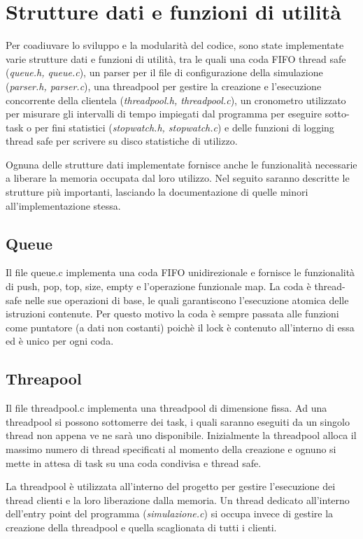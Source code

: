 \documentclass[11pt]{article}
\begin{document}
\section{Strutture dati e funzioni di utilità}
Per coadiuvare lo sviluppo e la modularità del codice, sono state implementate
varie strutture dati e funzioni di utilità, tra le quali una coda FIFO thread
safe (\emph{queue.h, queue.c}), un parser per il file di configurazione della
simulazione (\emph{parser.h, parser.c}), una threadpool per gestire la
creazione e l'esecuzione concorrente della clientela (\emph{threadpool.h,
  threadpool.c}), un cronometro utilizzato per misurare gli intervalli di tempo
impiegati dal programma per eseguire sotto-task o per fini statistici
(\emph{stopwatch.h, stopwatch.c}) e delle funzioni di logging thread safe per
scrivere su disco statistiche di utilizzo.

Ognuna delle strutture dati implementate fornisce anche le funzionalità
necessarie a liberare la memoria occupata dal loro utilizzo. Nel seguito
saranno descritte le strutture più importanti, lasciando la documentazione di
quelle minori all'implementazione stessa.

\subsection{Queue}
Il file queue.c implementa una coda FIFO unidirezionale e fornisce le
funzionalità di push, pop, top, size, empty e l'operazione funzionale map. La
coda è thread-safe nelle sue operazioni di base, le quali garantiscono
l'esecuzione atomica delle istruzioni contenute. Per questo motivo la coda è
sempre passata alle funzioni come puntatore (a dati non costanti) poichè il
lock è contenuto all'interno di essa ed è unico per ogni coda.

\subsection{Threapool}
Il file threadpool.c implementa una threadpool di dimensione fissa. Ad una
threadpool si possono sottomerre dei task, i quali saranno eseguiti da un
singolo thread non appena ve ne sarà uno disponibile. Inizialmente la
threadpool alloca il massimo numero di thread specificati al momento della
creazione e ognuno si mette in attesa di task su una coda condivisa e thread
safe.

La threadpool è utilizzata all'interno del progetto per gestire l'esecuzione
dei thread clienti e la loro liberazione dalla memoria. Un thread dedicato
all'interno dell'entry point del programma (\emph{simulazione.c}) si occupa
invece di gestire la creazione della threadpool e quella scaglionata di tutti i
clienti.
\end{document}
